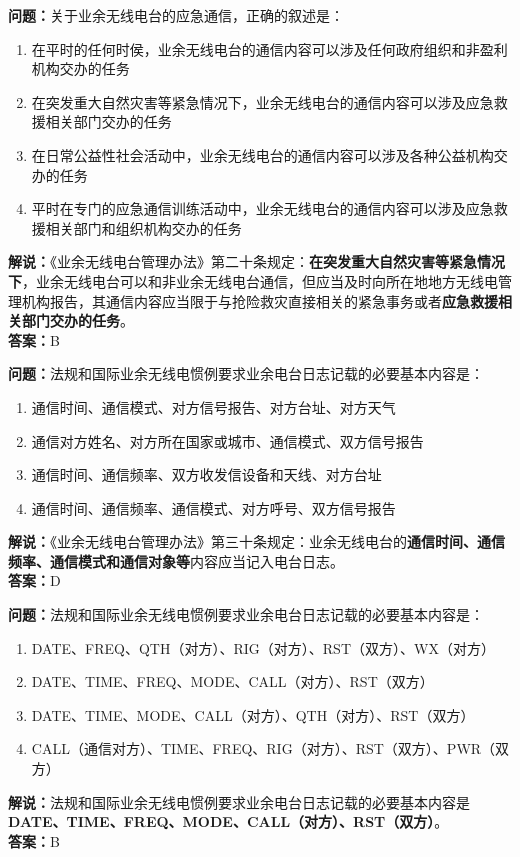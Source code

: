 \documentclass{ctexbook}
\begin{document}
\noindent\textbf{问题：}关于业余无线电台的应急通信，正确的叙述是：
\begin{enumerate}[label=\Alph*), leftmargin=3em]
	\item 在平时的任何时侯，业余无线电台的通信内容可以涉及任何政府组织和非盈利机构交办的任务
	\item 在突发重大自然灾害等紧急情况下，业余无线电台的通信内容可以涉及应急救援相关部门交办的任务
	\item 在日常公益性社会活动中，业余无线电台的通信内容可以涉及各种公益机构交办的任务
	\item 平时在专门的应急通信训练活动中，业余无线电台的通信内容可以涉及应急救援相关部门和组织机构交办的任务
\end{enumerate}
\noindent\textbf{解说：}《业余无线电台管理办法》第二十条规定：\textbf{在突发重大自然灾害等紧急情况下}，业余无线电台可以和非业余无线电台通信，但应当及时向所在地地方无线电管理机构报告，其通信内容应当限于与抢险救灾直接相关的紧急事务或者\textbf{应急救援相关部门交办的任务}。\\\noindent\textbf{答案：}B




\bigskip


\noindent\textbf{问题：}法规和国际业余无线电惯例要求业余电台日志记载的必要基本内容是：
\begin{enumerate}[label=\Alph*), leftmargin=3em]
	\item 通信时间、通信模式、对方信号报告、对方台址、对方天气
	\item 通信对方姓名、对方所在国家或城市、通信模式、双方信号报告
	\item 通信时间、通信频率、双方收发信设备和天线、对方台址
	\item 通信时间、通信频率、通信模式、对方呼号、双方信号报告
\end{enumerate}
\noindent\textbf{解说：}《业余无线电台管理办法》第三十条规定：业余无线电台的\textbf{通信时间、通信频率、通信模式和通信对象等}内容应当记入电台日志。\\\noindent\textbf{答案：}D



\bigskip


\noindent\textbf{问题：}法规和国际业余无线电惯例要求业余电台日志记载的必要基本内容是：
\begin{enumerate}[label=\Alph*), leftmargin=3em]
	\item DATE、FREQ、QTH（对方）、RIG（对方）、RST（双方）、WX（对方）
	\item DATE、TIME、FREQ、MODE、CALL（对方）、RST（双方）
	\item DATE、TIME、MODE、CALL（对方）、QTH（对方）、RST（双方）
	\item CALL（通信对方）、TIME、FREQ、RIG（对方）、RST（双方）、PWR（双方）
\end{enumerate}
\noindent\textbf{解说：}法规和国际业余无线电惯例要求业余电台日志记载的必要基本内容是\textbf{DATE、TIME、FREQ、MODE、CALL（对方）、RST（双方）}。\\\noindent\textbf{答案：}B
\end{document}
